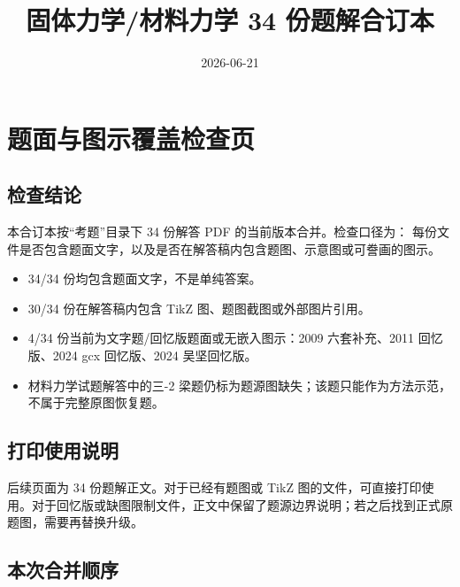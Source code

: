 \documentclass[11pt,a4paper]{ctexrep}
\title{固体力学/材料力学 34 份题解合订本}
\author{}
\date{2026-06-21}
\begin{document}
\maketitle
\tableofcontents
\newpage

\chapter*{题面与图示覆盖检查页}




\section*{检查结论}

本合订本按“考题”目录下 34 份解答 PDF 的当前版本合并。检查口径为：
每份文件是否包含题面文字，以及是否在解答稿内包含题图、示意图或可誊画的图示。

\begin{itemize}
  \item 34/34 份均包含题面文字，不是单纯答案。
  \item 30/34 份在解答稿内包含 TikZ 图、题图截图或外部图片引用。
  \item 4/34 份当前为文字题/回忆版题面或无嵌入图示：2009 六套补充、2011 回忆版、2024 gcx 回忆版、2024 吴坚回忆版。
  \item 材料力学试题解答中的三-2 梁题仍标为题源图缺失；该题只能作为方法示范，不属于完整原图恢复题。
\end{itemize}

\section*{打印使用说明}

后续页面为 34 份题解正文。对于已经有题图或 TikZ 图的文件，可直接打印使用。对于回忆版或缺图限制文件，正文中保留了题源边界说明；若之后找到正式原题图，需要再替换升级。

\section*{本次合并顺序}
\end{document}
